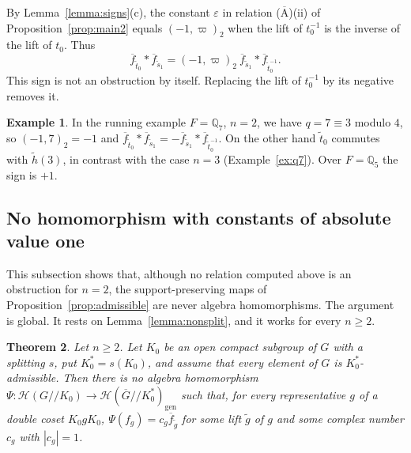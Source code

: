 \documentclass[12pt,letterpaper]{amsart}
\numberwithin{equation}{section}
\newtheorem{theorem}{Theorem}[section]
\theoremstyle{definition}
\newtheorem{example}[theorem]{Example}
\theoremstyle{remark}
\newcommand{\cH}{\mathcal{H}}
\newcommand{\Gbar}{\overline{G}}
\newcommand{\gen}{\mathrm{gen}}
\newcommand{\fbar}{\overline{f}}
\begin{document}
By Lemma~\ref{lemma:signs}(c), the constant $\varepsilon$ in relation
($\overline{\mbox{A}}$)(ii) of Proposition~\ref{prop:main2} equals
$(-1,\varpi)_2$ when the lift of $t_0^{-1}$ is the inverse of the lift
of $t_0$. Thus
\[
\fbar_{\tilde t_0}*\fbar_{\tilde s_1}
=(-1,\varpi)_2\ \fbar_{\tilde s_1}*\fbar_{\tilde t_0^{-1}} .
\]
This sign is not an obstruction by itself. Replacing the lift of
$t_0^{-1}$ by its negative removes it.

\begin{example}
\label{ex:signs}
In the running example $F=\mathbb{Q}_7$, $n=2$, we have $q=7\equiv 3$
modulo $4$, so $(-1,7)_2=-1$ and
$\fbar_{\tilde t_0}*\fbar_{\tilde s_1}
=-\fbar_{\tilde s_1}*\fbar_{\tilde t_0^{-1}}$. On the other hand
$\tilde t_0$ commutes with $\tilde h(3)$, in contrast with the case
$n=3$ (Example~\ref{ex:q7}). Over $F=\mathbb{Q}_5$ the sign is $+1$.
\end{example}

\subsection{No homomorphism with constants of absolute value one}
This subsection shows that, although no relation computed above is an
obstruction for $n=2$, the support-preserving maps of
Proposition~\ref{prop:admissible} are never algebra homomorphisms. The
argument is global. It rests on Lemma~\ref{lemma:nonsplit}, and it
works for every $n\geq 2$.

\begin{theorem}
\label{thm:unimodular}
Let $n\geq 2$. Let $K_0$ be an open compact subgroup of $G$ with a
splitting $s$, put $K_0^*=s(K_0)$, and assume that every element of $G$
is $K_0^*$-admissible. Then there is no algebra homomorphism
$\Psi:\cH(G/\!/K_0)\to\cH(\Gbar/\!/K_0^*)_{\gen}$ such that, for every
representative $g$ of a double coset $K_0gK_0$,
$\Psi(f_g)=c_g\fbar_{\tilde g}$ for some lift $\tilde g$ of $g$ and
some complex number $c_g$ with $|c_g|=1$.
\end{theorem}
\end{document}
